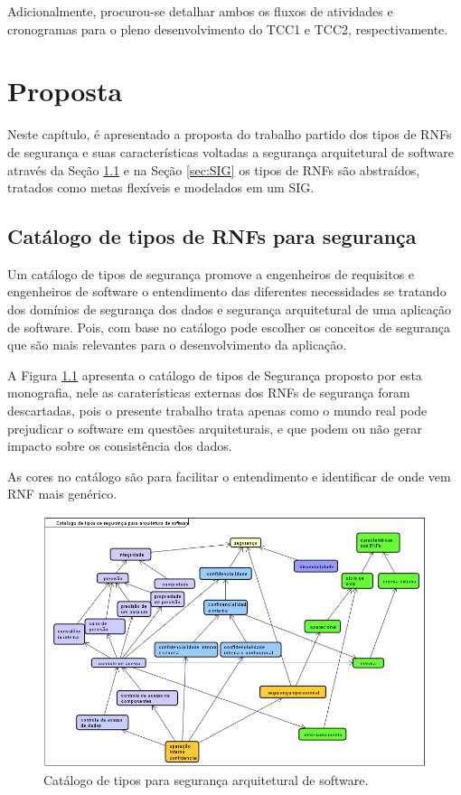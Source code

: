 Adicionalmente, procurou-se detalhar ambos os fluxos de atividades e cronogramas para o pleno desenvolvimento do TCC1 e TCC2, respectivamente.

\chapter{Proposta}
\label{chap:proposta}

Neste capítulo, é apresentado a proposta do trabalho partido dos tipos de RNFs de segurança e suas características voltadas a segurança arquitetural de software através da Seção \ref{sec:CatalogoDeTiposDeNFRsParaSeguranca} e na Seção \ref{sec:SIG} os tipos de RNFs são abstraídos, tratados como metas flexíveis e modelados em um SIG.  

\section{Catálogo de tipos de RNFs para segurança}
\label{sec:CatalogoDeTiposDeNFRsParaSeguranca}

Um catálogo de tipos de segurança promove a engenheiros de requisitos e engenheiros de software o entendimento das diferentes necessidades se tratando dos domínios de segurança dos dados e segurança arquitetural de uma aplicação de software. Pois, com base no catálogo pode escolher os conceitos de segurança que são mais relevantes para o desenvolvimento da aplicação.

A Figura \ref{catalogoDeTipos} apresenta o catálogo de tipos de Segurança proposto por esta monografia, nele as caraterísticas externas dos RNFs de segurança foram descartadas, pois o presente trabalho trata apenas como o mundo real pode prejudicar o software em questões arquiteturais, e que podem ou não gerar impacto sobre os consistência dos dados.    

As cores no catálogo são para facilitar o entendimento e identificar de onde vem RNF mais genérico. 

\begin{figure}[h!]
	\centering
	\includegraphics[keepaspectratio=true,scale=0.6]{figuras/catalogoDeTiposSeguranca.PNG}
	\caption{Catálogo de tipos para segurança arquitetural de software.}
	\label{catalogoDeTipos}
\end{figure}

